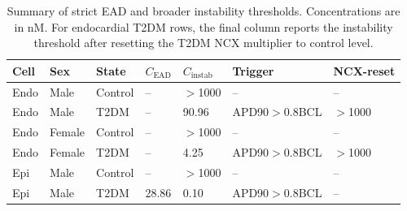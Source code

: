 \begin{table}[t]
\caption{Summary of strict EAD and broader instability thresholds. Concentrations are in nM. For endocardial T2DM rows, the final column reports the instability threshold after resetting the T2DM NCX multiplier to control level.}
\centering
\begin{tabular}{lllllll}
\hline
Cell & Sex & State & $C_{\mathrm{EAD}}$ & $C_{\mathrm{instab}}$ & Trigger & NCX-reset \\
\hline
Endo & Male & Control & -- & $>$1000 & -- & -- \\
Endo & Male & T2DM & -- & 90.96 & APD90$>$0.8BCL & $>$1000 \\
Endo & Female & Control & -- & $>$1000 & -- & -- \\
Endo & Female & T2DM & -- & 4.25 & APD90$>$0.8BCL & $>$1000 \\
Epi & Male & Control & -- & $>$1000 & -- & -- \\
Epi & Male & T2DM & 28.86 & 0.10 & APD90$>$0.8BCL & -- \\
\hline
\end{tabular}
\label{tab:threshold_summary}
\end{table}
